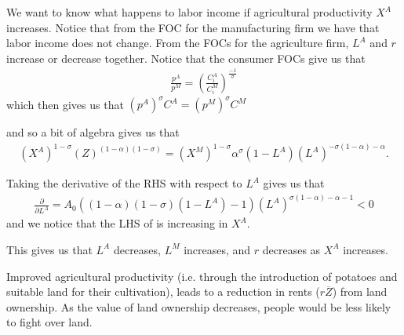 We want to know what happens to labor income if agricultural productivity $X^A$ increases. Notice that from the FOC for the manufacturing firm we have that labor income does not change. From the FOCs for the agriculture firm, $L^A$ and $r$ increase or decrease together. Notice that the consumer FOCs give us that 
\begin{align}
    \frac{p^A}{p^M}=\left(\frac{C_i^A}{C_i^M}\right)^{\frac{-1}{\sigma}}
\end{align}
which then gives us that $(p^A)^\sigma C^A = (p^M)^\sigma C^M$

and so a bit of algebra gives us that 
\begin{align}
    (X^A)^{1-\sigma}(Z)^{(1-\alpha)(1-\sigma)} = (X^M)^{1-\sigma}\alpha^\sigma (1-L^A)(L^A)^{-\sigma(1-\alpha)-\alpha}.
    \end{align}

    Taking the derivative of the RHS with respect to $L^A$ gives us that
    \begin{align}
        \frac{\partial}{\partial L^A}  = A_0((1-\alpha)(1-\sigma)(1-L^A)-1)(L^A)^{\sigma(1-\alpha)-\alpha-1}<0
    \end{align}
    and we notice that the LHS of is increasing in $X^A$.
    
    This gives us that $L^A$ decreases, $L^M$ increases, and $r$ decreases as $X^A$ increases.


Improved agricultural productivity (i.e. through the introduction of potatoes and 
suitable land for their cultivation), leads to a reduction in rents ($r\overline{Z}$) 
from land ownership. As the value of land ownership decreases, people would be less likely to fight over land. 